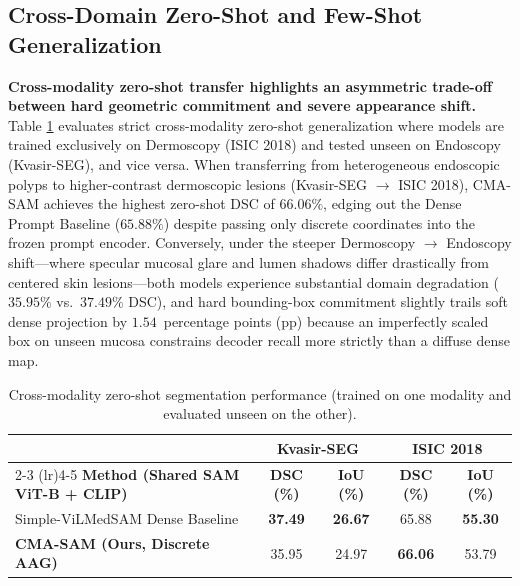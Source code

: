 \documentclass[onecolumn]{IEEEtran}
\numberwithin{equation}{section}
\theoremstyle{definition}
\theoremstyle{remark}
\begin{document}
\subsection{Cross-Domain Zero-Shot and Few-Shot Generalization}

\textbf{Cross-modality zero-shot transfer highlights an asymmetric trade-off between hard geometric commitment and severe appearance shift.} Table \ref{tab:zero_shot_comparison} evaluates strict cross-modality zero-shot generalization where models are trained exclusively on Dermoscopy (ISIC 2018) and tested unseen on Endoscopy (Kvasir-SEG), and vice versa. When transferring from heterogeneous endoscopic polyps to higher-contrast dermoscopic lesions (Kvasir-SEG $\rightarrow$ ISIC 2018), CMA-SAM achieves the highest zero-shot DSC of $66.06\%$, edging out the Dense Prompt Baseline ($65.88\%$) despite passing only discrete coordinates into the frozen prompt encoder. Conversely, under the steeper Dermoscopy $\rightarrow$ Endoscopy shift—where specular mucosal glare and lumen shadows differ drastically from centered skin lesions—both models experience substantial domain degradation ($35.95\%$ vs.\ $37.49\%$ DSC), and hard bounding-box commitment slightly trails soft dense projection by $1.54$~percentage points (pp) because an imperfectly scaled box on unseen mucosa constrains decoder recall more strictly than a diffuse dense map.

\begin{table}[!htbp]
\centering
\caption{Cross-modality zero-shot segmentation performance (trained on one modality and evaluated unseen on the other).}
\label{tab:zero_shot_comparison}
\begin{tabularx}{\linewidth}{@{}Xcccc@{}}
\toprule
 & \multicolumn{2}{c}{\textbf{Kvasir-SEG \cite{jha2020kvasir}}} & \multicolumn{2}{c}{\textbf{ISIC 2018 \cite{codella2018skin}}} \\
\cmidrule(lr){2-3} \cmidrule(lr){4-5}
\textbf{Method (Shared SAM ViT-B + CLIP)} & \textbf{DSC (\%)} & \textbf{IoU (\%)} & \textbf{DSC (\%)} & \textbf{IoU (\%)} \\
\midrule
Simple-ViLMedSAM Dense Baseline \cite{qian2024simplevilmedsam} & \textbf{37.49} & \textbf{26.67} & 65.88 & \textbf{55.30} \\
\textbf{CMA-SAM (Ours, Discrete AAG)} & 35.95 & 24.97 & \textbf{66.06} & 53.79 \\
\bottomrule
\end{tabularx}
\end{table}
\end{document}
